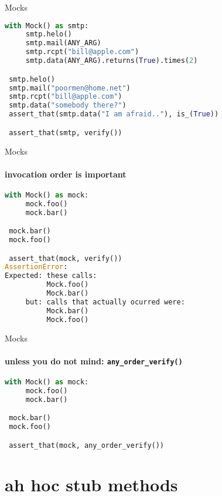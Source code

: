 \documentclass[11pt]{beamer}
\begin{document}
\begin{frame}[fragile]{Mocks}

\begin{exampleblock}{}
\begin{lstlisting}[language=Python]
 with Mock() as smtp:
     smtp.helo()
     smtp.mail(ANY_ARG)
     smtp.rcpt("bill@apple.com")
     smtp.data(ANY_ARG).returns(True).times(2)

 smtp.helo()
 smtp.mail("poormen@home.net")
 smtp.rcpt("bill@apple.com")
 smtp.data("somebody there?")
 assert_that(smtp.data("I am afraid.."), is_(True))

 assert_that(smtp, verify())
\end{lstlisting}
\end{exampleblock}
\end{frame}

\begin{frame}[fragile]{Mocks}
\framesubtitle{invocation order is important}

\begin{exampleblock}{}
\begin{lstlisting}[language=Python]
 with Mock() as mock:
     mock.foo()
     mock.bar()

 mock.bar()
 mock.foo()

 assert_that(mock, verify())
AssertionError:
Expected: these calls:
          Mock.foo()
          Mock.bar()
     but: calls that actually ocurred were:
          Mock.bar()
          Mock.foo()
\end{lstlisting}
\end{exampleblock}
\end{frame}

\begin{frame}[fragile]{Mocks}
\framesubtitle{unless you do not mind: \texttt{any\_order\_verify()}}

\begin{exampleblock}{}
\begin{lstlisting}[language=Python]
 with Mock() as mock:
     mock.foo()
     mock.bar()

 mock.bar()
 mock.foo()

 assert_that(mock, any_order_verify())
\end{lstlisting}
\end{exampleblock}
\end{frame}


\section{ah hoc stub methods}
\end{document}
